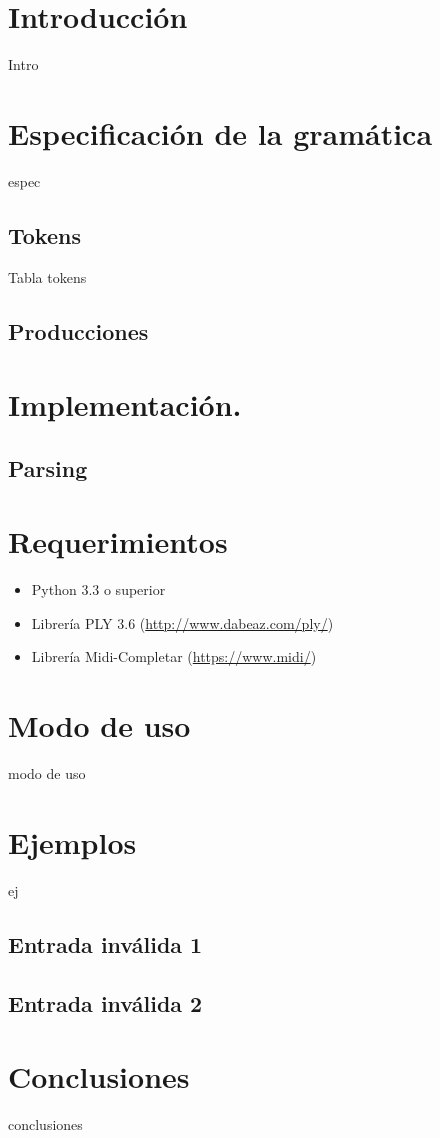 \documentclass[a4paper,8pt]{article}
\begin{document}
\pagestyle{myheadings}
\maketitle
\thispagestyle{empty}
\tableofcontents


\newpage

\section{Introducción}
Intro


\section{Especificación de la gramática}
espec
\subsection{Tokens}
Tabla tokens
\subsection{Producciones}

\section{Implementación.}
\subsection{Parsing}

\section{Requerimientos}
	\begin{itemize}
  		\item Python 3.3 o superior
  		\item Librería PLY 3.6 (\url{http://www.dabeaz.com/ply/})
  		\item Librería Midi-Completar (\url{https://www.midi/})
	\end{itemize}

\section{Modo de uso}
modo de uso


\section{Ejemplos}
ej
\subsection{Entrada inválida 1}
\subsection{Entrada inválida 2}



\section{Conclusiones}
conclusiones

\newpage
\end{document}
